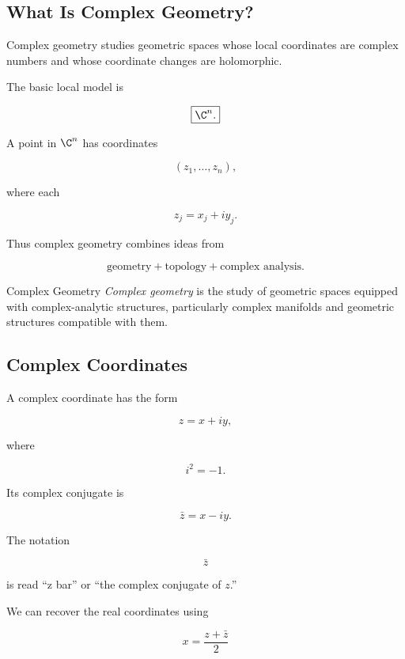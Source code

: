 \subsection{What Is Complex Geometry?}
\label{subsec:what-is-complex-geometry}

Complex geometry studies geometric spaces whose local coordinates are
complex numbers and whose coordinate changes are holomorphic.

The basic local model is

\[
\boxed{\C^n.}
\]

A point in \(\C^n\) has coordinates

\[
(z_1,\ldots,z_n),
\]

where each

\[
z_j=x_j+iy_j.
\]

Thus complex geometry combines ideas from

\[
\boxed{
\text{geometry}
+
\text{topology}
+
\text{complex analysis}.
}
\]

\begin{definitionbox}{Complex Geometry}
\emph{Complex geometry} is the study of geometric spaces equipped with
complex-analytic structures, particularly complex manifolds and geometric
structures compatible with them.
\end{definitionbox}

\subsection{Complex Coordinates}
\label{subsec:complex-coordinates}

A complex coordinate has the form

\[
\boxed{z=x+iy,}
\]

where

\[
i^2=-1.
\]

Its complex conjugate is

\[
\boxed{\bar z=x-iy.}
\]

The notation

\[
\bar z
\]

is read ``z bar'' or ``the complex conjugate of \(z\).''

We can recover the real coordinates using

\[
\boxed{x=\frac{z+\bar z}{2}}
\]

